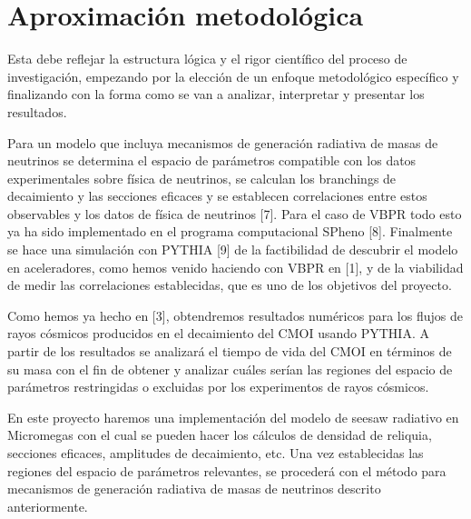 \section{Aproximación metodológica}
\begin{instrucciones}
  Esta debe reflejar la estructura lógica y el
rigor científico del proceso de investigación, empezando por la elección de un enfoque
metodológico específico y finalizando con la forma como se van a analizar, interpretar y presentar
los resultados.
\end{instrucciones}

Para un modelo que incluya mecanismos de generación radiativa de masas de neutrinos se determina el espacio de parámetros compatible con los datos experimentales sobre física de neutrinos, se calculan los branchings de decaimiento y las secciones eficaces y se establecen correlaciones entre estos observables y los datos de física de neutrinos [7]. Para el caso de VBPR todo esto ya ha sido implementado en el programa computacional SPheno [8]. Finalmente se hace una simulación con PYTHIA [9] de la factibilidad de descubrir el modelo en aceleradores, como hemos venido haciendo con VBPR en [1], y de la viabilidad de medir las correlaciones establecidas, que es uno de los objetivos del proyecto.

Como hemos ya hecho en [3], obtendremos resultados numéricos para los flujos de rayos cósmicos  producidos en el decaimiento del CMOI usando PYTHIA. A partir de los resultados se analizará el tiempo de vida del CMOI  en términos de su masa con el fin de obtener y analizar cuáles serían las regiones del espacio de parámetros restringidas o excluidas por los experimentos de rayos cósmicos.

En este proyecto haremos una implementación del modelo de seesaw radiativo en Micromegas  con el cual se pueden hacer los cálculos de densidad de reliquia, secciones eficaces, amplitudes de decaimiento, etc. Una vez establecidas las regiones del espacio de parámetros relevantes, se procederá con el método para mecanismos de generación radiativa de masas de neutrinos descrito anteriormente.

